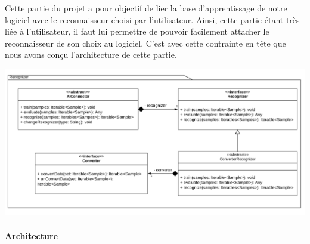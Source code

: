 Cette partie du projet a pour objectif de lier la base d'apprentissage de notre logiciel avec le reconnaisseur choisi par l'utilisateur. Ainsi, cette partie étant très liée à l'utilisateur, il faut lui permettre de pouvoir facilement attacher le reconnaisseur de son choix au logiciel. C'est avec cette contrainte en tête que nous avons conçu l'architecture de cette partie.

\begin{mdframed}[frametitle={Architecture de l'interface avec le reconnaisseur}, innerbottommargin=10]
\begin{center}
\includegraphics[trim={0, 0, 0, 0}, scale=0.55]{assets/UML_Recognizer.pdf}
\end{center}
\end{mdframed}

\paragraph{Architecture}


